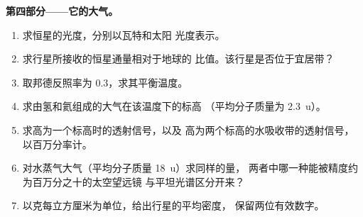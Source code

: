 \begin{problem}
\medskip\noindent\textbf{第四部分——它的大气。}
\begin{enumerate}[resume]
\item 求恒星的光度，分别以瓦特和太阳
  光度表示。
\item 求行星所接收的恒星通量相对于地球的
  比值。该行星是否位于宜居带？
\item 取邦德反照率为 0.3，求其平衡温度。
\item 求由氢和氦组成的大气在该温度下的标高
  （平均分子质量为 \qty{2.3}{u}）。
\item 求高为一个标高时的透射信号，以及
  高为两个标高的水吸收带的透射信号，以百万分率计。
\item 对水蒸气大气（平均分子质量 \qty{18}{u}）求同样的量，
  两者中哪一种能被精度约为百万分之十的太空望远镜
  与平坦光谱区分开来？
\item 以克每立方厘米为单位，给出行星的平均密度，
  保留两位有效数字。
\end{enumerate}
\end{problem}
